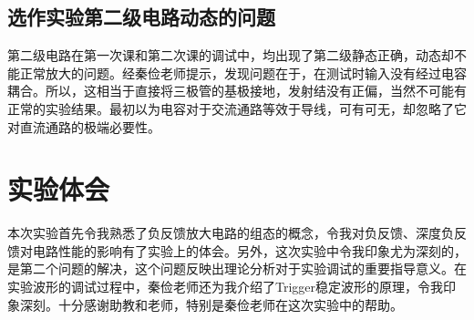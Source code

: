 \documentclass[12pt,a4paper]{article}
\begin{document}
\begin{spacing}{1.3}
\subsection{选作实验第二级电路动态的问题}
第二级电路在第一次课和第二次课的调试中，均出现了第二级静态正确，动态却不能正常放大的问题。经秦俭老师提示，发现问题在于，在测试时输入没有经过电容耦合。所以，这相当于直接将三极管的基极接地，发射结没有正偏，当然不可能有正常的实验结果。最初以为电容对于交流通路等效于导线，可有可无，却忽略了它对直流通路的极端必要性。
\section{实验体会}
本次实验首先令我熟悉了负反馈放大电路的组态的概念，令我对负反馈、深度负反馈对电路性能的影响有了实验上的体会。另外，这次实验中令我印象尤为深刻的，是第二个问题的解决，这个问题反映出理论分析对于实验调试的重要指导意义。在实验波形的调试过程中，秦俭老师还为我介绍了Trigger稳定波形的原理，令我印象深刻。十分感谢助教和老师，特别是秦俭老师在这次实验中的帮助。
\end{spacing}
\end{document}
